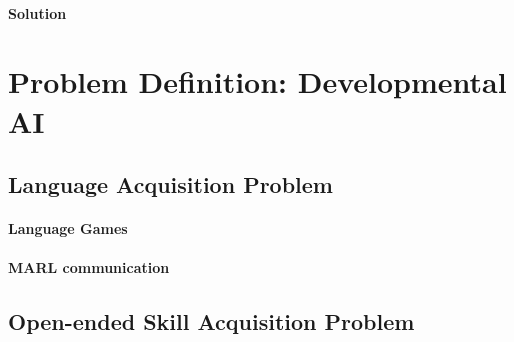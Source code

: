 \paragraph{Solution}

\section{Problem Definition: Developmental AI}


\subsection{Language Acquisition Problem}


\paragraph{Language Games}

\paragraph{MARL communication}


\subsection{Open-ended Skill Acquisition Problem}



